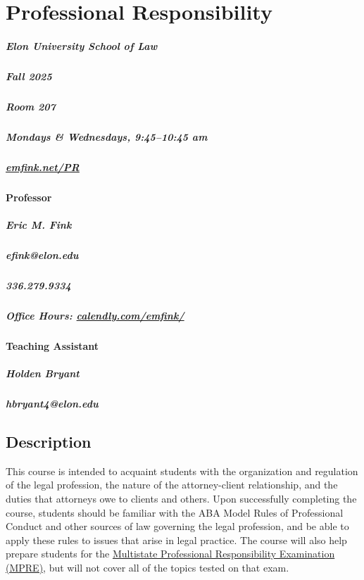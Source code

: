 \documentclass[11pt,letterpaper,twoside]{article}
\begin{document}
\thispagestyle{empty}

\color{OffBlack}


\section{Professional Responsibility}

\begin{footnotesize}
\subparagraph{Elon University School of Law}
\subparagraph{Fall 2025}
\subparagraph{Room 207}
\subparagraph{Mondays \& Wednesdays, 9:45--10:45 am}
\subparagraph{\url{emfink.net/PR}}
\vspace{1em}

\paragraph{Professor}
\subparagraph{Eric M. Fink} 
\subparagraph{efink@elon.edu}
\subparagraph{336.279.9334} 
\subparagraph{Office Hours: {\url{calendly.com/emfink/}}}

\vspace{1em}

\paragraph{Teaching Assistant}
\subparagraph{Holden Bryant}
\subparagraph{hbryant4@elon.edu}
\end{footnotesize}
\vspace{1em}


\subsection{Description}\label{description}

This course is intended to acquaint students with the organization and
regulation of the legal profession, the nature of the attorney-client
relationship, and the duties that attorneys owe to clients and others.
Upon successfully completing the course, students should be familiar
with the ABA Model Rules of Professional Conduct and other sources of
law governing the legal profession, and be able to apply these rules to
issues that arise in legal practice. The course will also help prepare
students for the \href{https://www.ncbex.org/exams/mpre/}{Multistate
Professional Responsibility Examination (MPRE)}, but will not cover all
of the topics tested on that exam.
\end{document}
